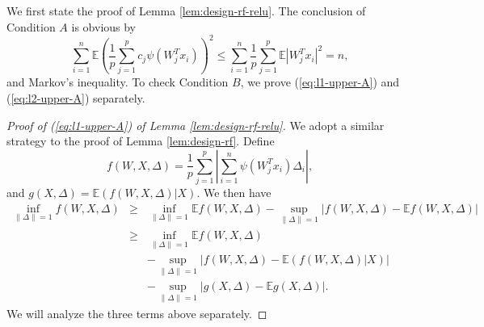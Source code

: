 We first state the proof of Lemma \ref{lem:design-rf-relu}. 
The conclusion of Condition $A$ is obvious by
$$\sum_{i=1}^n\mathbb{E}\left(\frac{1}{p}\sum_{j=1}^pc_j\psi(W_j^Tx_i)\right)^2\leq \sum_{i=1}^n\frac{1}{p}\sum_{j=1}^p\mathbb{E}|W_j^Tx_i|^2= n,$$
and Markov's inequality. To check Condition $B$, we prove (\ref{eq:l1-upper-A}) and (\ref{eq:l2-upper-A}) separately.
\begin{proof}[Proof of (\ref{eq:l1-upper-A}) of Lemma \ref{lem:design-rf-relu}]
We adopt a similar strategy to the proof of Lemma \ref{lem:design-rf}. Define
$$f(W,X,\Delta)=\frac{1}{p}\sum_{j=1}^p\left|\sum_{i=1}^n\psi(W_j^Tx_i)\Delta_i\right|,$$
and $g(X,\Delta)=\mathbb{E}(f(W,X,\Delta)|X)$.
We then have
\begin{eqnarray}
\nonumber \inf_{\|\Delta\|=1}f(W,X,\Delta) &\geq& \inf_{\|\Delta\|=1}\mathbb{E}f(W,X,\Delta) - \sup_{\|\Delta\|=1}\left|f(W,X,\Delta)-\mathbb{E}f(W,X,\Delta)\right| \\
\label{eq:exp-f-inf} &\geq& \inf_{\|\Delta\|=1}\mathbb{E}f(W,X,\Delta) \\
\label{eq:ep-f} && - \sup_{\|\Delta\|=1}\left|f(W,X,\Delta)-\mathbb{E}(f(W,X,\Delta)|X)\right| \\
\label{eq:ep-g} && - \sup_{\|\Delta\|=1}\left|g(X,\Delta)-\mathbb{\mathbb{E}}g(X,\Delta)\right|.
\end{eqnarray}
We will analyze the three terms above separately.


\end{proof}
